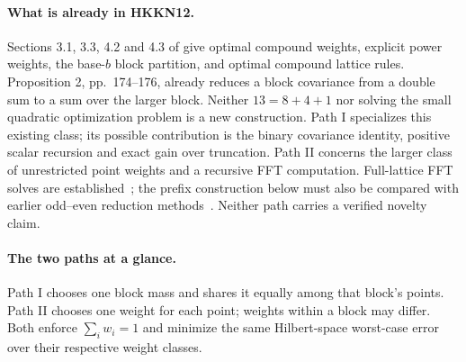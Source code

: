\documentclass[11pt]{article}
\begin{document}
\paragraph{What is already in HKKN12.}
Sections 3.1, 3.3, 4.2 and 4.3 of \cite{HKKN12} give optimal compound
weights, explicit power weights, the base-$b$ block partition, and optimal
compound lattice rules. Proposition 2, pp.~174--176, already reduces a
block covariance from a double sum to a sum over the larger block.
Neither $13=8+4+1$ nor solving the small quadratic optimization problem
is a new construction. Path I specializes this existing class; its possible contribution is
the binary covariance identity, positive scalar recursion and exact
gain over truncation. Path II concerns the larger class of unrestricted
point weights and a recursive FFT computation. Full-lattice FFT solves
are established~\cite{ZLH06,ZKH09,JH19,KKKNS22}; the prefix construction
below must also be compared with earlier odd--even reduction
methods~\cite{Madsen83,TAK07,BM09}. Neither path carries a verified
novelty claim.

\paragraph{The two paths at a glance.}
Path I chooses one block mass and shares it equally among that block's
points. Path II chooses one weight for each point; weights within a
block may differ. Both enforce $\sum_iw_i=1$ and minimize the same
Hilbert-space worst-case error over their respective weight classes.
\end{document}
